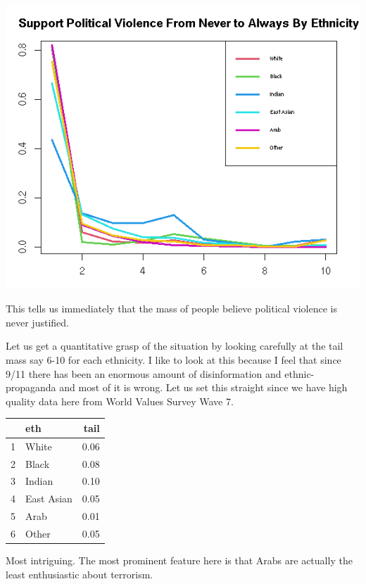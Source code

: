 \documentclass{amsart}
\begin{document}
\includegraphics[scale=0.8]{pveth.jpeg}

This tells us immediately that the mass of people believe political violence is never justified.

Let us get a quantitative grasp of the situation by looking carefully at the tail mass say 6-10 for each ethnicity.  I like to look at this because I feel that since 9/11 there has been an enormous amount of disinformation and ethnic-propaganda and most of it is wrong.  Let us set this straight since we have high quality data here from World Values Survey Wave 7.

\begin{table}[ht]
\centering
\begin{tabular}{rlr}
  \hline
 & eth & tail \\ 
  \hline
1 & White & 0.06 \\ 
  2 & Black & 0.08 \\ 
  3 & Indian & 0.10 \\ 
  4 & East Asian & 0.05 \\ 
  5 & Arab & 0.01 \\ 
  6 & Other & 0.05 \\ 
   \hline
\end{tabular}
\end{table}

Most intriguing.  The most prominent feature here is that Arabs are actually the least enthusiastic about terrorism.
\end{document}
